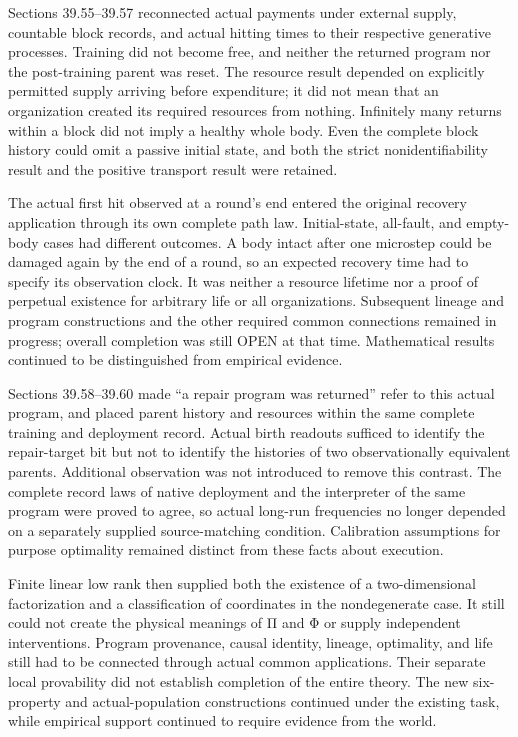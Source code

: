 \documentclass[
  english,
  11pt,
  oneside]{book}
\begin{document}
Sections 39.55--39.57 reconnected actual payments under external supply, countable block records, and actual hitting times to their respective generative processes. Training did not become free, and neither the returned program nor the post-training parent was reset. The resource result depended on explicitly permitted supply arriving before expenditure; it did not mean that an organization created its required resources from nothing. Infinitely many returns within a block did not imply a healthy whole body. Even the complete block history could omit a passive initial state, and both the strict nonidentifiability result and the positive transport result were retained.

The actual first hit observed at a round's end entered the original recovery application through its own complete path law. Initial-state, all-fault, and empty-body cases had different outcomes. A body intact after one microstep could be damaged again by the end of a round, so an expected recovery time had to specify its observation clock. It was neither a resource lifetime nor a proof of perpetual existence for arbitrary life or all organizations. Subsequent lineage and program constructions and the other required common connections remained in progress; overall completion was still OPEN at that time. Mathematical results continued to be distinguished from empirical evidence.

Sections 39.58--39.60 made ``a repair program was returned'' refer to this actual program, and placed parent history and resources within the same complete training and deployment record. Actual birth readouts sufficed to identify the repair-target bit but not to identify the histories of two observationally equivalent parents. Additional observation was not introduced to remove this contrast. The complete record laws of native deployment and the interpreter of the same program were proved to agree, so actual long-run frequencies no longer depended on a separately supplied source-matching condition. Calibration assumptions for purpose optimality remained distinct from these facts about execution.

Finite linear low rank then supplied both the existence of a two-dimensional factorization and a classification of coordinates in the nondegenerate case. It still could not create the physical meanings of Π and Φ or supply independent interventions. Program provenance, causal identity, lineage, optimality, and life still had to be connected through actual common applications. Their separate local provability did not establish completion of the entire theory. The new six-property and actual-population constructions continued under the existing task, while empirical support continued to require evidence from the world.
\end{document}

